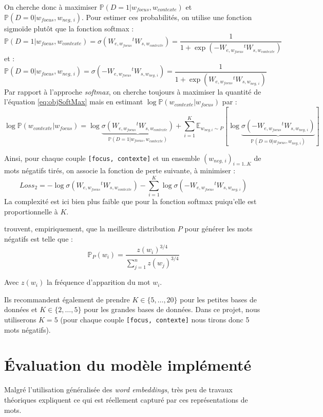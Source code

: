 \documentclass[11pt,french,french]{article}
\begin{document}
On cherche donc à maximiser
\(\mathbb P(D=1\vert w_{focus},w_{contexte})\) et
\(\mathbb P(D=0\vert w_{focus},w_{neg,\,i})\). Pour estimer ces
probabilités, on utilise une fonction sigmoïde plutôt que la fonction
softmax : \[
\mathbb P(D=1\vert w_{focus},w_{contexte})=\sigma(W_{e,w_{focus}}{}^tW_{s,w_{contexte}}) = 
\frac{1}{1+\exp(-W_{e,w_{focus}}{}^tW_{s,w_{contexte}})}
\] et : \[
\mathbb P(D=0\vert w_{focus},w_{neg,\,i})=\sigma(-W_{e,w_{focus}}{}^tW_{s,w_{neg,\,i}}) = 
\frac{1}{1+\exp(W_{e,w_{focus}}{}^tW_{s,w_{neg,\,i}})}
\] Par rapport à l'approche \emph{softmax}, on cherche toujours à
maximiser la quantité de l'équation \eqref{eq:objSoftMax} mais en estimant
\(\log\mathbb P(w_{contexte}\vert w_{focus})\) par : \[
\log\mathbb P(w_{contexte}\vert w_{focus}) =
\log\underbrace{\sigma (W_{e,w_{focus}}{}^tW_{s,w_{contexte}})}_{
\mathbb P(D=1\vert w_{focus},w_{contexte})
}+
\sum_{i=1}^K\mathbb E_{w_{neg,i}\sim P}[
\log
\underbrace{\sigma (-W_{e,w_{focus}}{}^tW_{s,w_{neg,\,i}})}_{
\mathbb P(D=0\vert w_{focus},w_{neg,\,i})
}
]
\]

Ainsi, pour chaque couple \texttt{{[}focus,\ contexte{]}} et un ensemble
\((w_{neg,\,i})_{i=1..K}\) de mots négatifs tirés, on associe la
fonction de perte suivante, à minimiser : \[
Loss_{2}=-\log\sigma (W_{e,w_{focus}}{}^tW_{s,w_{contexte}})
-
\sum_{i=1}^K
\log
\sigma (-W_{e,w_{focus}}{}^tW_{s,w_{neg,\,i}})
\] La complexité est ici bien plus faible que pour la fonction softmax
puiqu'elle est proportionnelle à \(K\).

\cite{MikolovNS} trouvent, empiriquement, que la meilleure distribution
\(P\) pour générer les mots négatifs est telle que : \[
\mathbb P_P(w_i) = \frac{z(w_i)^{3/4}}{
\sum_{j=1}^n z(w_j)^{3/4}
}
\]

Avec \(z(w_i)\) la fréquence d'apparition du mot \(w_i\).

Ils recommandent également de prendre \(K\in\{5,\dots,20\}\) pour les
petites bases de données et \(K\in\{2,\dots,5\}\) pour les grandes bases
de données. Dans ce projet, nous utiliserons \(K=5\) (pour chaque couple
\texttt{{[}focus,\ contexte{]}} nous tirons donc 5 mots négatifs).

\section{Évaluation du modèle implémenté}\label{sec:evaluation}

Malgré l'utilisation généralisée des \emph{word embeddings}, très peu de
travaux théoriques expliquent ce qui est réellement capturé par ces
représentations de mots.
\end{document}
